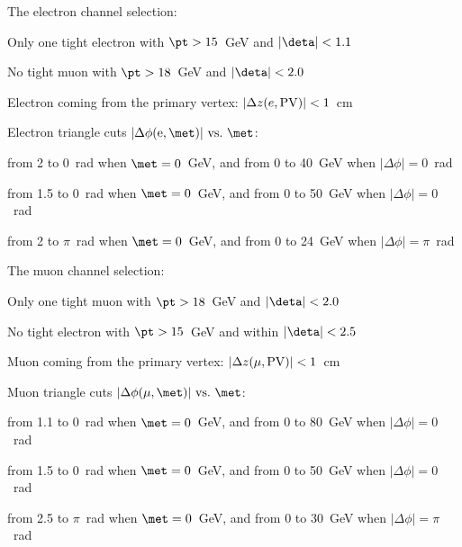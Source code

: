 The electron channel selection: 
\vspace{-0.07in}
\begin{myitemize}
\item Only one tight electron with ${\pt} > 15$~GeV and $|\deta| < 1.1$
\item No tight muon with ${\pt} > 18$~GeV and $|\deta| < 2.0$ 
\item Electron coming from the primary vertex:
$|\Delta z(e,{\rm PV})| < 1$~cm
\item Electron triangle cuts $|\Delta\phi({\rm e,{\met}})|{\rm ~vs.~}
{\met}$:
   \vspace{-0.07in} 
   \begin{myitemize}
   \item from 2 to 0~rad when ${\met} = 0$~GeV, and {\met} from 0
   to 40~GeV when $|\Delta\phi| = 0$~rad
   \item from 1.5 to 0~rad when ${\met} = 0$~GeV, and {\met} from 0
   to 50~GeV when $|\Delta\phi| = 0$~rad
   \item  from 2 to $\pi$~rad when ${\met} = 0$~GeV, and {\met}
   from 0 to 24~GeV when $|\Delta\phi| = \pi$~rad
   \end{myitemize}
\end{myitemize}

The muon channel selection: 
\vspace{-0.07in}
\begin{myitemize}
\item Only one tight muon with ${\pt} > 18$~GeV and $|\deta| < 2.0$ 
\item No tight electron with ${\pt} > 15$~GeV and within $|\deta|
< 2.5$
\item Muon coming from the primary vertex: $|\Delta z(\mu,{\rm PV})|
< 1$~cm
\item Muon triangle cuts $|\Delta\phi(\mu,{\rm {\met}})|{\rm ~vs.~}
{\met}$: 
   \vspace{-0.07in}
   \begin{myitemize}
   \item  from 1.1 to 0~rad when ${\met} = 0$~GeV, and {\met}
   from 0 to 80~GeV when $|\Delta\phi| = 0$~rad
   \item  from 1.5 to 0~rad when ${\met} = 0$~GeV, and {\met}
   from 0 to 50~GeV when $|\Delta\phi| = 0$~rad
   \item from 2.5 to $\pi$~rad when ${\met} = 0$~GeV, and {\met}
   from 0 to 30~GeV when $|\Delta\phi| = \pi$~rad
   \end{myitemize}
\end{myitemize}

